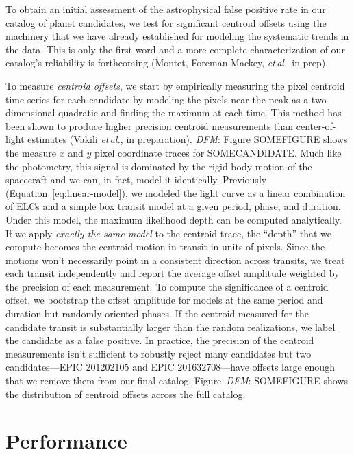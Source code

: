\documentclass[12pt,preprint]{aastex}
\newcommand{\foreign}[1]{\emph{#1}}
\newcommand{\etal}{\foreign{et\,al.}}
\newcommand{\eqalt}[1]{Equation~\ref{eq:#1}}
\newcommand{\sectlabel}[1]{\label{sect:#1}}
\newcommand{\todo}[3]{{\color{#2}\emph{#1}: #3}}
\newcommand{\dfmtodo}[1]{\todo{DFM}{red}{#1}}
\begin{document}
To obtain an initial assessment of the astrophysical false positive rate in
our catalog of planet candidates, we test for significant centroid offsets
using the machinery that we have already established for modeling the
systematic trends in the data.
This is only the first word and a more complete characterization of our
catalog's reliability is forthcoming (Montet, Foreman-Mackey, \etal\ in prep).

To measure \emph{centroid offsets}, we start by empirically measuring the
pixel centroid time series for each candidate by modeling the pixels near the
peak as a two-dimensional quadratic and finding the maximum at each time.
This method has been shown to produce higher precision centroid measurements
than center-of-light estimates (Vakili \etal, in preparation).
\dfmtodo{Figure SOMEFIGURE shows the measure $x$ and $y$ pixel coordinate traces for
SOMECANDIDATE.}
Much like the photometry, this signal is dominated by the rigid body motion
of the spacecraft and we can, in fact, model it identically.
Previously (\eqalt{linear-model}), we modeled the light curve as a linear
combination of ELCs and a simple box transit model at a given period, phase,
and duration.
Under this model, the maximum likelihood depth can be computed analytically.
If we apply \emph{exactly the same model} to the centroid trace, the ``depth''
that we compute becomes the centroid motion in transit in units of pixels.
Since the motions won't necessarily point in a consistent direction across
transits, we treat each transit independently and report the average offset
amplitude weighted by the precision of each measurement.
To compute the significance of a centroid offset, we bootstrap the offset
amplitude for models at the same period and duration but randomly oriented
phases.
If the centroid measured for the candidate transit is substantially larger
than the random realizations, we label the candidate as a false positive.
In practice, the precision of the centroid measurements isn't sufficient to
robustly reject many candidates but two candidates---EPIC 201202105 and EPIC
201632708---have offsets large enough that we remove them from our final
catalog.
Figure~\dfmtodo{SOMEFIGURE} shows the distribution of centroid offsets across the full
catalog.


\section{Performance}
\sectlabel{perform}
\end{document}
